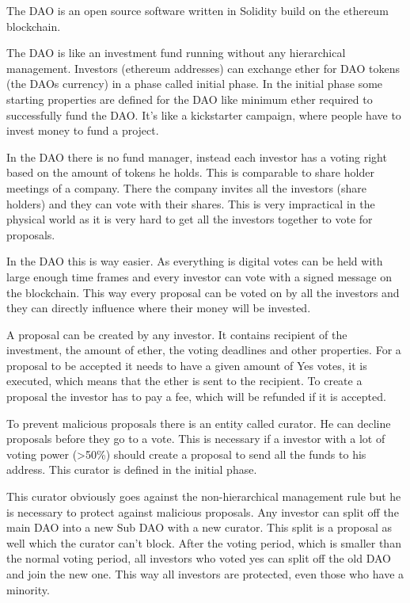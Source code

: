 \documentclass[a4paper, 11pt]{scrartcl}
\begin{document}
The DAO is an open source software written in Solidity build on the ethereum blockchain.

The DAO is like an investment fund running without any hierarchical management.
Investors (ethereum addresses) can exchange ether for DAO tokens (the DAOs currency) in a phase called initial phase. In the initial phase some starting properties are defined for the DAO like minimum ether required to successfully fund the DAO. It's like a kickstarter campaign, where people have to invest money to fund a project.

In the DAO there is no fund manager, instead each investor has a voting right based on the amount of tokens he holds. This is comparable to share holder meetings of a company. There the company invites all the investors (share holders) and they can vote with their shares. This is very impractical in the physical world as it is very hard to get all the investors together to vote for proposals. 

In the DAO this is way easier. As everything is digital votes can be held with large enough time frames and every investor can vote with a signed message on the blockchain. This way every proposal can be voted on by all the investors and they can directly influence where their money will be invested. 

A proposal can be created by any investor. It contains recipient of the investment, the amount of ether, the voting deadlines and other properties. For a proposal to be accepted it needs to have a given amount of Yes votes, it is executed, which means that the ether is sent to the recipient. To create a proposal the investor has to pay a fee, which will be refunded if it is accepted. 

To prevent malicious proposals there is an entity called curator. He can decline proposals before they go to a vote. This is necessary if a investor with a lot of voting power (>50\%) should create a proposal to send all the funds to his address. This curator is defined in the initial phase.

This curator obviously goes against the non-hierarchical management rule but he is necessary to protect against malicious proposals. Any investor can split off the main DAO into a new Sub DAO with a new curator. This split is a proposal as well which the curator can't block. After the voting period, which is smaller than the normal voting period, all investors who voted yes can split off the old DAO and join the new one. This way all investors are protected, even those who have a minority.
\end{document}
